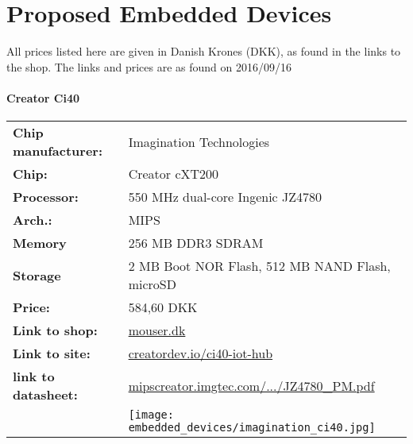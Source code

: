 \chapter{Proposed Embedded Devices}\label{app:embedded_devices}

All prices listed here are given in Danish Krones (DKK),
as found in the links to the shop.
The links and prices are as found on 2016/09/16


\subsubsection*{Creator Ci40}
\begin{tabular}{ l l }

	\textbf{Chip manufacturer:} &
	Imagination Technologies \\

	\textbf{Chip:} &
	Creator cXT200 \\

	\textbf{Processor:} &
	550 MHz dual-core Ingenic JZ4780 \\

	\textbf{Arch.:} &
	MIPS \\

	\textbf{Memory} &
	256 MB DDR3 SDRAM \\

	\textbf{Storage} &
	2 MB Boot NOR Flash, 512 MB NAND Flash, microSD \\

	\textbf{Price:} &
	584,60 DKK \\

	\textbf{Link to shop:} &
	\href{http://www.mouser.dk/search/ProductDetail.aspx?R=0virtualkey0virtualkeyVL-62913}{mouser.dk} \\

	\textbf{Link to site:} &
	\href{http://www.creatordev.io/ci40-iot-hub}{creatordev.io/ci40-iot-hub} \\

	\textbf{link to datasheet:} &
	\href{http://mipscreator.imgtec.com/CI20/hardware/soc/JZ4780_PM.pdf}{mipscreator.imgtec.com/.../JZ4780\_PM.pdf} \\

	&
	\texttt{[image: embedded\_devices/imagination\_ci40.jpg]} \\

\end{tabular}


